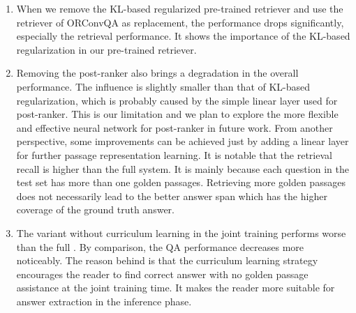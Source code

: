 \begin{enumerate}
    \item When we remove the KL-based regularized pre-trained retriever and use the retriever of ORConvQA as replacement, the performance drops significantly, especially the retrieval performance. It shows the importance of the KL-based regularization in our pre-trained retriever.
    \item Removing the post-ranker also brings a degradation in the overall performance. The influence is slightly smaller than that of KL-based regularization, which is probably caused by the simple linear layer used for post-ranker. This is our limitation and we plan to explore the more flexible and effective neural network for post-ranker in future work. From another perspective, some improvements can be achieved just by adding a linear layer for further passage representation learning.
    It is notable that the retrieval recall is higher than the full system. It is mainly because each question in the test set has more than one golden passages. Retrieving more golden passages does not necessarily lead to the better answer span which has the higher coverage of the ground truth answer.
    \item The variant without curriculum learning in the joint training performs worse than the full {\modelname}. By comparison, the QA performance decreases more noticeably. The reason behind is that the curriculum learning strategy encourages the reader to find correct answer with no golden passage assistance at the joint training time. It makes the reader more suitable for answer extraction in the inference phase.
\end{enumerate}

